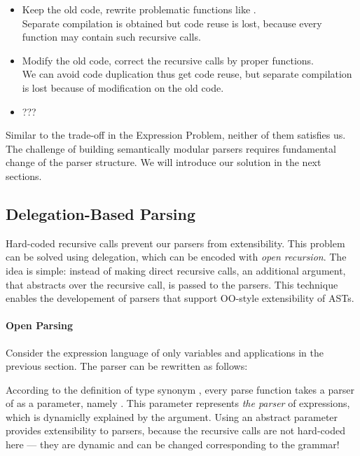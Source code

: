 \begin{itemize}
    \item Keep the old code, rewrite problematic functions like . \\Separate compilation is obtained but code reuse is lost, because every function may contain such recursive calls.
    \item Modify the old code, correct the recursive calls by proper functions. \\We can avoid code duplication thus get code reuse, but separate compilation is lost because of modification on the old code.
    \item ??? 
\end{itemize}

Similar to the trade-off in the Expression Problem, neither of them satisfies us. The challenge of building semantically modular parsers requires fundamental change of the parser structure. We will introduce our solution in the next sections.

\subsection{Delegation-Based Parsing}\label{subsec:overview-delegation}

Hard-coded recursive calls prevent our parsers from extensibility.
This problem can be solved using delegation, which can be encoded with
\textit{open recursion}. The idea is simple: instead of making direct
recursive calls, an additional argument, that abstracts over the
recursive call, is passed to the parsers. This technique enables the
developement of parsers that support OO-style extensibility of ASTs.

\paragraph{Open Parsing} Consider the expression language of only variables and applications in the previous section. The parser can be rewritten as follows:


According to the definition of type synonym ,
every parse function takes a parser of  as a
parameter, namely . This parameter 
represents \emph{the parser} of expressions, which is dynamiclly
explained by the argument. Using an abstract parameter provides
extensibility to parsers, because the recursive calls are not
hard-coded here --- they are dynamic and can be changed corresponding
to the grammar!

